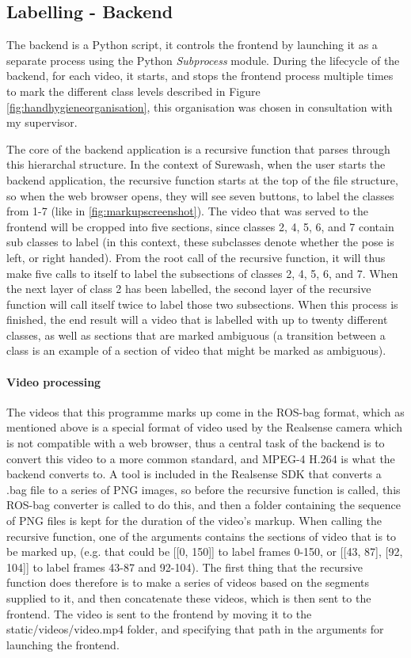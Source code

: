    \subsection{Labelling - Backend}
    The backend is a Python script, it controls the frontend by launching it as a separate process using the Python {\slshape Subprocess} module. During the lifecycle of the backend, for each video, it starts, and stops the frontend process multiple times to mark the different class levels described in Figure \ref{fig:handhygieneorganisation}, this organisation was chosen in consultation with my supervisor.


    The core of the backend application is a recursive function that parses through this hierarchal structure. In the context of Surewash, when the user starts the backend application, the recursive function starts at the top of the file structure, so when the web browser opens, they will see seven buttons, to label the classes from 1-7 (like in \ref{fig:markupscreenshot}). The video that was served to the frontend will be cropped into five sections, since classes 2, 4, 5, 6, and 7 contain sub classes to label (in this context, these subclasses denote whether the pose is left, or right handed). From the root call of the recursive function, it will thus make five calls to itself to label the subsections of classes 2, 4, 5, 6, and 7. When the next layer of class 2 has been labelled, the second layer of the recursive function will call itself twice to label those two subsections. When this process is finished, the end result will a video that is labelled with up to twenty different classes, as well as sections that are marked ambiguous (a transition between a class is an example of a section of video that might be marked as ambiguous).

    \paragraph{Video processing}
    The videos that this programme marks up come in the ROS-bag format, which as mentioned above is a special format of video used by the Realsense camera which is not compatible with a web browser, thus a central task of the backend is to convert this video to a more common standard, and MPEG-4 H.264 is what the backend converts to. A tool is included in the Realsense SDK that converts a .bag file to a series of PNG images, so before the recursive function is called, this ROS-bag converter is called to do this, and then a folder containing the sequence of PNG files is kept for the duration of the video's markup. When calling the recursive function, one of the arguments contains the sections of video that is to be marked up, (e.g. that could be [[0, 150]] to label frames 0-150, or [[43, 87], [92, 104]] to label frames 43-87 and 92-104). The first thing that the recursive function does therefore is to make a series of videos based on the segments supplied to it, and then concatenate these videos, which is then sent to the frontend. The video is sent to the frontend by moving it to the static/videos/video.mp4 folder, and specifying that path in the arguments for launching the frontend.

